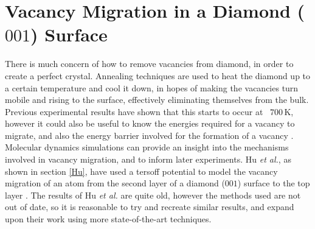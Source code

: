 \documentclass[10pt,a4paper,twocolumn,twoside]{extarticle}
\newcommand{\al}{\emph{et al.}}
\begin{document}



\section{Vacancy Migration in a Diamond ($001$) Surface}
\label{sec:vacancy}
There is much concern of how to remove vacancies from diamond, in order to create a perfect crystal. Annealing techniques are used to heat the diamond up to a certain temperature and cool it down, in hopes of making the vacancies turn mobile and rising to the surface, effectively eliminating themselves from the bulk. Previous experimental results have shown that this starts to occur at ~$700$\,K, however it could also be useful to know the energies required for a vacancy to migrate, and also the energy barrier involved for the formation of a vacancy \cite{VacancyTemp}. Molecular dynamics simulations can provide an insight into the mechanisms involved in vacancy migration, and to inform later experiments. Hu \al, as shown in section \ref{Hu}, have used a tersoff potential to model the vacancy migration of an atom from the second layer of a diamond ($001$) surface to the top layer \cite{hu}.
The results of Hu {\al} are quite old, however the methods used are not out of date, so it is reasonable to try and recreate similar results, and expand upon their work using more state-of-the-art techniques. 
\end{document}

